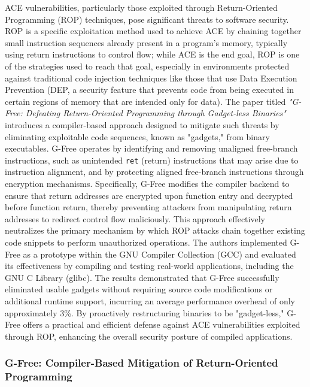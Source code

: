 \documentclass[a4paper]{usiinfbachelorproject}
\begin{document}
ACE vulnerabilities, particularly those exploited through Return-Oriented Programming (ROP) techniques, pose significant threats to software security. ROP is a specific exploitation method used to achieve ACE by chaining together small instruction sequences already present in a program’s memory, typically using return instructions to control flow; while ACE is the end goal, ROP is one of the strategies used to reach that goal, especially in environments protected against traditional code injection techniques like those that use Data Execution Prevention (DEP, a security feature that prevents code from being executed in certain regions of memory that are intended only for data). The paper titled \textit{"G-Free: Defeating Return-Oriented Programming through Gadget-less Binaries"} introduces a compiler-based approach designed to mitigate such threats by eliminating exploitable code sequences, known as "gadgets," from binary executables. G-Free operates by identifying and removing unaligned free-branch instructions, such as unintended \texttt{ret} (return) instructions that may arise due to instruction alignment, and by protecting aligned free-branch instructions through encryption mechanisms. Specifically, G-Free modifies the compiler backend to ensure that return addresses are encrypted upon function entry and decrypted before function return, thereby preventing attackers from manipulating return addresses to redirect control flow maliciously. This approach effectively neutralizes the primary mechanism by which ROP attacks chain together existing code snippets to perform unauthorized operations. The authors implemented G-Free as a prototype within the GNU Compiler Collection (GCC) and evaluated its effectiveness by compiling and testing real-world applications, including the GNU C Library (glibc). The results demonstrated that G-Free successfully eliminated usable gadgets without requiring source code modifications or additional runtime support, incurring an average performance overhead of only approximately 3\%. By proactively restructuring binaries to be "gadget-less," G-Free offers a practical and efficient defense against ACE vulnerabilities exploited through ROP, enhancing the overall security posture of compiled applications.

\subsubsection{G-Free: Compiler-Based Mitigation of Return-Oriented Programming}
\end{document}

